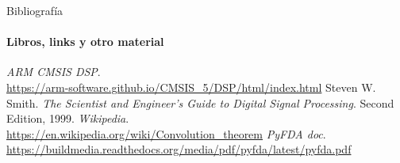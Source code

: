 \begin{frame}{Bibliografía}
   \framesubtitle{Libros, links y otro material}
   \begin{thebibliography}{9}
         \emph{ARM CMSIS DSP}. \\
         \href {https://arm-software.github.io/CMSIS_5/DSP/html/index.html}{https://arm-software.github.io/CMSIS\_5/DSP/html/index.html}
         Steven W. Smith.
         \emph{The Scientist and Engineer's Guide to Digital Signal Processing}.
         Second Edition, 1999.
         \emph{Wikipedia}. \\
         \href {https://en.wikipedia.org/wiki/Convolution\_theorem}{https://en.wikipedia.org/wiki/Convolution\_theorem}
         \emph{PyFDA doc}. \\
         \href {https://buildmedia.readthedocs.org/media/pdf/pyfda/latest/pyfda.pdf}{https://buildmedia.readthedocs.org/media/pdf/pyfda/latest/pyfda.pdf}
 \end{thebibliography}
\end{frame}

